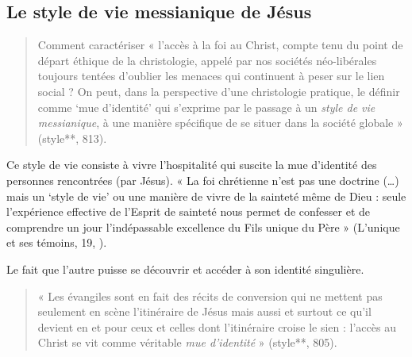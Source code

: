 \subsection{Le style de vie messianique de Jésus}


\begin{quote}
    Comment caractériser « l’accès à la foi au Christ, compte tenu du point de départ éthique de la christologie, appelé par nos sociétés néo-libérales toujours tentées d’oublier les menaces qui continuent à peser sur le lien social ? On peut, dans la perspective d’une christologie pratique, le définir comme ‘mue d’identité’ qui s’exprime par le passage à un\textit{ style de vie messianique}, à une manière spécifique de se situer dans la société globale » (style**, 813).
\end{quote}

\begin{Def}
Ce style de vie consiste à vivre l’hospitalité qui suscite la mue
d’identité des personnes rencontrées (par Jésus). « La foi chrétienne n’est pas une doctrine
(…) mais un ‘style de vie’ ou une manière de vivre de la sainteté même de Dieu : seule
l’expérience effective de l’Esprit de sainteté nous permet de confesser et de comprendre un
jour l’indépassable excellence du Fils unique du Père » (L’unique et ses témoins, 19, \cite[p. 794]{theobald_christianisme_2007}).
\end{Def}

\begin{Def}
Le fait que l’autre puisse se découvrir et accéder à son identité singulière.

\end{Def}

\begin{quote}
    « Les évangiles sont en fait des récits de conversion qui ne mettent pas seulement en scène l’itinéraire de Jésus mais aussi et surtout ce qu’il devient en et pour ceux et celles dont l’itinéraire croise le sien : l’accès au Christ se vit comme véritable \textit{mue d’identité} » (style**, 805). 
\end{quote}



